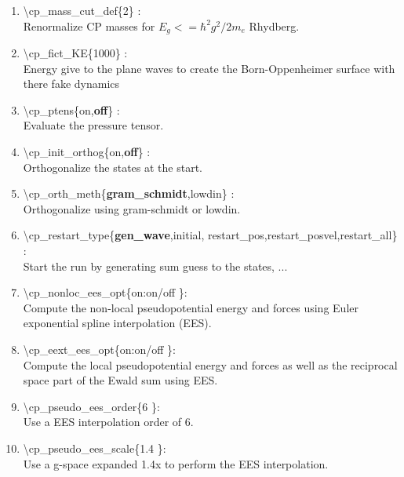 \documentclass[12pt,titlepage]{article}
\begin{document}
\begin{enumerate}
 \vspace{0.15in} 
 \item  \textbackslash{}cp\_mass\_cut\_def\{2\} : \\
      Renormalize CP masses for $E_g<=\hbar^2g^2/2m_e$ Rhydberg.

 \vspace{0.15in} 
 \item  \textbackslash{}cp\_fict\_KE\{1000\} : \\
      Energy give to the plane waves to create the Born-Oppenheimer
      surface with there fake dynamics

 \vspace{0.15in} 
 \item  \textbackslash{}cp\_ptens\{on,{\bf off}\} : \\
      Evaluate the pressure tensor. 

 \vspace{0.15in} 
 \item  \textbackslash{}cp\_init\_orthog\{on,{\bf off}\} : \\
      Orthogonalize the states at the start.

 \vspace{0.15in} 
 \item  \textbackslash{}cp\_orth\_meth\{{\bf gram\_schmidt},lowdin\} : \\
      Orthogonalize using gram-schmidt or lowdin.

 \vspace{0.15in} 
 \item  \textbackslash{}cp\_restart\_type\{{\bf gen\_wave},initial,
                         restart\_pos,restart\_posvel,restart\_all\} : \\
      Start the run by generating sum guess to the states, ...

 \vspace{0.15in} 
 \item  \textbackslash{}cp\_nonloc\_ees\_opt\{on:on/off \}: \\     
 Compute the non-local pseudopotential energy and forces using Euler
 exponential spline interpolation (EES).

 \vspace{0.15in} 
 \item  \textbackslash{}cp\_eext\_ees\_opt\{on:on/off \}: \\     
     Compute the local pseudopotential energy and forces as well as the 
     reciprocal space part of the Ewald sum using  EES.

 \vspace{0.15in} 
 \item  \textbackslash{}cp\_pseudo\_ees\_order\{6 \}: \\     
     Use a EES interpolation order of 6.

 \vspace{0.15in} 
 \item  \textbackslash{}cp\_pseudo\_ees\_scale\{1.4 \}: \\     
     Use a g-space expanded 1.4x to perform the EES interpolation.
\end{enumerate}
\end{document}

